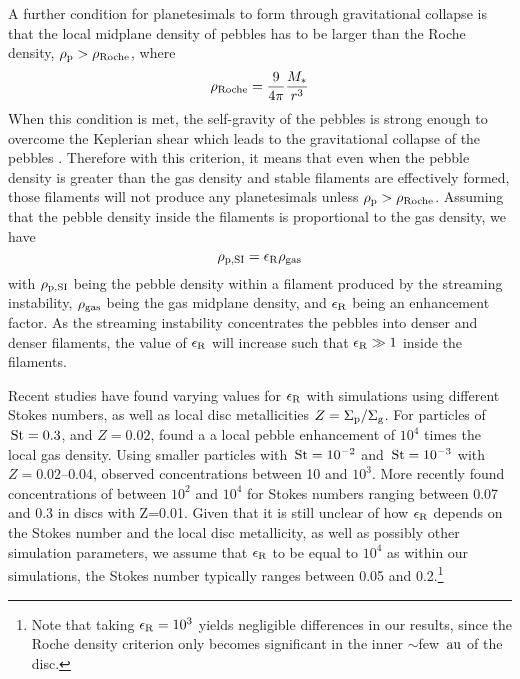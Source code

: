 \documentclass[a4paper,fleqn,usenatbib]{mnras}
\newcommand{\au}{{\, {\rm au}}}
\newcommand{\Stokes}{{\, {\rm St}}}
\begin{document}
A further condition for planetesimals to form through gravitational collapse is that the local midplane density of pebbles has to be larger than the Roche density, $\rho_{\rm p} > \rho_{\rm Roche}$, where
\begin{equation}
    \rho_{\rm Roche} = \frac{9}{4\pi}\frac{M_*}{r^3}
\end{equation}
When this condition is met, the self-gravity of the pebbles is strong enough to overcome the Keplerian shear which leads to the gravitational collapse of the pebbles \citep{GoldreichWard73,Johansen14}.
Therefore with this criterion, it means that even when the pebble density is greater than the gas density and stable filaments are effectively formed, those filaments will not produce any planetesimals unless $\rho_{\rm p}>\rho_{\rm Roche}$.
Assuming that the pebble density inside the filaments is proportional to the gas density, we have
\begin{equation}
    \rho_{\rm p,SI} = \epsilon_{\rm R}\rho_{\rm gas}
\end{equation}
with $\rho_{\rm p,SI}$ being the pebble density within a filament produced by the streaming instability,  $\rho_{\rm gas}$ being the gas midplane density, and $\epsilon_{\rm R}$ being an enhancement factor.
As the streaming instability concentrates the pebbles into denser and denser filaments, the value of $\epsilon_{\rm R}$ will increase such that $\epsilon_{\rm R} \gg 1$ inside the filaments.

Recent studies have found varying values for $\epsilon_{\rm R}$ with simulations using different Stokes numbers, as well as local disc metallicities $Z = \Sigma_{\rm p}/\Sigma_{\rm g}$.
For particles of $\Stokes=0.3$, and $Z=0.02$, \citet{Johansen15} found a a local pebble enhancement of $10^4$ times the local gas density.
Using smaller particles with $\Stokes = 10^{-2}$ and $\Stokes = 10^{-3}$ with $Z=0.02$--$0.04$, \citet{Yang17} observed concentrations between 10 and $10^3$.
More recently \citet{Carrera21} found concentrations of between $10^2$ and $10^4$ for Stokes numbers ranging between 0.07 and 0.3 in discs with Z=0.01.
Given that it is still unclear of how $\epsilon_{\rm R}$ depends on the Stokes number and the local disc metallicity, as well as possibly other simulation parameters, we assume that $\epsilon_{\rm R}$ to be equal to $10^4$ as within our simulations, the Stokes number typically ranges between 0.05 and 0.2.\footnote{Note that taking $\epsilon_{\rm R}=10^3$ yields negligible differences in our results, since the Roche density criterion only becomes significant in the inner $\sim$few $\au$ of the disc.}
\end{document}
